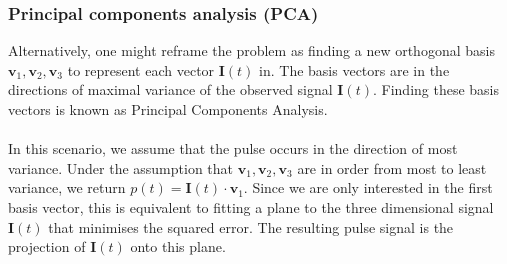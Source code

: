 \subsubsection{Principal components analysis (PCA)}
Alternatively, one might reframe the problem as finding a new orthogonal basis $\mathbf{v}_1, \mathbf{v}_2, \mathbf{v}_3$ to represent each vector $\mathbf{I}(t)$ in. The basis vectors are in the directions of maximal variance of the observed signal $\mathbf{I}(t)$. Finding these basis vectors is known as Principal Components Analysis.
\\\\
In this scenario, we assume that the pulse occurs in the direction of most variance.
Under the assumption that $\mathbf{v}_1, \mathbf{v}_2, \mathbf{v}_3$ are in order from most to least variance, we return $p(t) = \mathbf{I}(t)\cdot\mathbf{v}_1$.
Since we are only interested in the first basis vector, this is equivalent to fitting a plane to the three dimensional signal $\mathbf{I}(t)$ that minimises the squared error. The resulting pulse signal is the projection of $\mathbf{I}(t)$ onto this plane.







